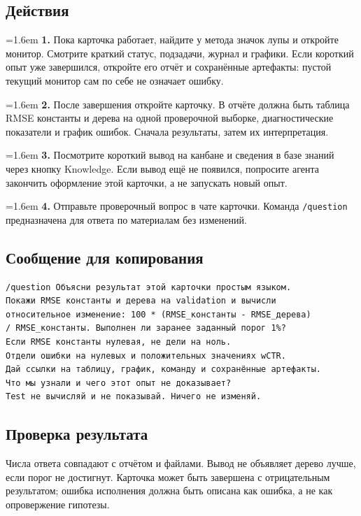 \documentclass[10pt,a4paper]{article}
\begin{document}
\subsection*{Действия}
\par\noindent\hangindent=1.6em \textbf{1.} Пока карточка работает, найдите у метода значок лупы и откройте монитор. Смотрите краткий статус, подзадачи, журнал и графики. Если короткий опыт уже завершился, откройте его отчёт и сохранённые артефакты: пустой текущий монитор сам по себе не означает ошибку.\par
\par\noindent\hangindent=1.6em \textbf{2.} После завершения откройте карточку. В отчёте должна быть таблица RMSE константы и дерева на одной проверочной выборке, диагностические показатели и график ошибок. Сначала результаты, затем их интерпретация.\par
\par\noindent\hangindent=1.6em \textbf{3.} Посмотрите короткий вывод на канбане и сведения в базе знаний через кнопку Knowledge. Если вывод ещё не появился, попросите агента закончить оформление этой карточки, а не запускать новый опыт.\par
\par\noindent\hangindent=1.6em \textbf{4.} Отправьте проверочный вопрос в чате карточки. Команда \texttt{/question} предназначена для ответа по материалам без изменений.\par
\subsection*{Сообщение для копирования}
\begin{promptbox}
\begin{Verbatim}
/question Объясни результат этой карточки простым языком.
Покажи RMSE константы и дерева на validation и вычисли
относительное изменение: 100 * (RMSE_константы - RMSE_дерева)
/ RMSE_константы. Выполнен ли заранее заданный порог 1%?
Если RMSE константы нулевая, не дели на ноль.
Отдели ошибки на нулевых и положительных значениях wCTR.
Дай ссылки на таблицу, график, команду и сохранённые артефакты.
Что мы узнали и чего этот опыт не доказывает?
Test не вычисляй и не показывай. Ничего не изменяй.
\end{Verbatim}
\end{promptbox}
\subsection*{Проверка результата}
Числа ответа совпадают с отчётом и файлами. Вывод не объявляет дерево лучше, если порог не достигнут. Карточка может быть завершена с отрицательным результатом; ошибка исполнения должна быть описана как ошибка, а не как опровержение гипотезы.
\end{document}
